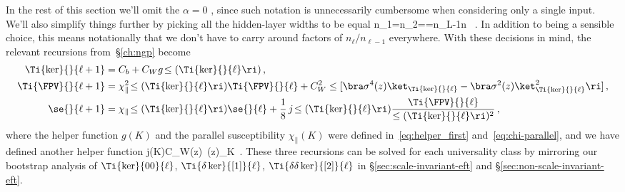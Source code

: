 In the rest of this section we'll omit the $\alpha=0$ , since such notation is unnecessarily cumbersome when considering only a single input. We'll also simplify things further by picking all the hidden-layer widths to be equal
\be\label{eq:chapter-eft-hidden-layer-widths-equal}
n_1=n_2=\cdots=n_{L-1}\equiv n \, .
\ee 
In addition to being a sensible choice, this means notationally that we don't have to carry around factors of $n_{\ell} / n_{\ell-1}$ everywhere.
With these decisions in mind, the relevant recursions from~\S\ref{ch:ngp} become
\begin{align}\label{eq:finite-width-reprinted-kernel}
\Ti{\ker}{}{\ell+1}&=C_b+C_W g\!\le(\Ti{\ker}{}{\ell}\ri)\, ,\\
\label{eq:finite-width-reprinted-vertex}
\Ti{\FPV}{}{\ell+1}&=\chi^2_{\parallel}\!\le(\Ti{\ker}{}{\ell}\ri)\Ti{\FPV}{}{\ell}+C_W^2\le[\bra \sigma^4(z) \ket_{\Ti{\ker}{}{\ell}}-\bra \sigma^2(z) \ket_{\Ti{\ker}{}{\ell}}^2\ri]\, ,\\
\label{eq:finite-width-reprinted-self-energy}
\se{}{\ell+1}&=\chi_{\parallel}\!\le(\Ti{\ker}{}{\ell}\ri)\se{}{\ell}+\frac{1}{8}\, j\!\le(\Ti{\ker}{}{\ell}\ri)\frac{\Ti{\FPV}{}{\ell}}{\le(\Ti{\ker}{}{\ell}\ri)^2}\, ,
\end{align}
where the helper function $g(K)$ and the parallel susceptibility $\chi_{\parallel}(K)$ were defined in~\eqref{eq:helper_first} and~\eqref{eq:chi-parallel}, and we have defined another
helper function
\be\label{eq:g4}
j(K)\equiv C_W\le\langle \sigma(z)\, \sigma(z)\!\ri\rangle_{K}\, .
\ee
These three recursions can be solved for each universality class by mirroring our bootstrap analysis of $\Ti{\ker}{00}{\ell}$, $\Ti{\delta \ker}{[1]}{\ell}$, $\Ti{\delta\delta\ker}{[2]}{\ell}$ in \S\ref{sec:scale-invariant-eft} and \S\ref{sec:non-scale-invariant-eft}.







